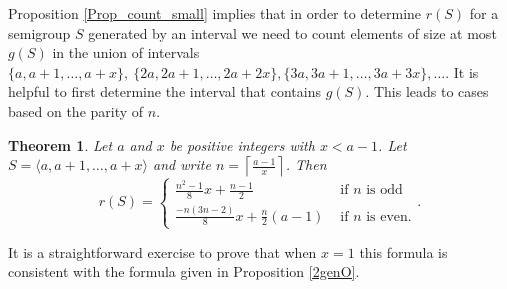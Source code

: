 \documentclass[12pt]{amsart}
\theoremstyle{plain}\newtheorem{proposition}{Proposition}[section]
\newtheorem{thm}[proposition]{Theorem}
\begin{document}
Proposition \ref{Prop_count_small} implies that in order to determine $r(S)$ for a semigroup $S$ generated by an interval we need to count elements of size at most $g(S)$ in the union of intervals $\{a,a+1,\ldots, a+x\},\ \{2a,2a+1,\ldots, 2a+2x\},\{3a,3a+1,\ldots, 3a+3x\},\ldots$.  It is helpful to first determine the interval that contains $g(S)$.  This leads to cases based on the parity of $n$.
\begin{thm}\label{thm_ord_interval}
Let $a$ and $x$ be positive integers with $x < a-1$. Let $S = \langle a,a+1,\ldots, a+x\rangle$ and write $n = \left\lceil \frac{a-1}{x} \right\rceil$.  Then
\[
r(S) = 
\begin{cases}
\frac{n^2-1}{8} x + \frac{n-1}{2} & \text{ if } n \text{ is odd}\\
\frac{-n(3n-2)}{8}x+\frac{n}{2}(a-1) & \text{ if } n \text{ is even}.
\end{cases}.
\]
\end{thm}
\noindent It is a straightforward exercise to prove that when $x = 1$ this formula is consistent with the formula given in Proposition \ref{2genO}.  
\end{document}

